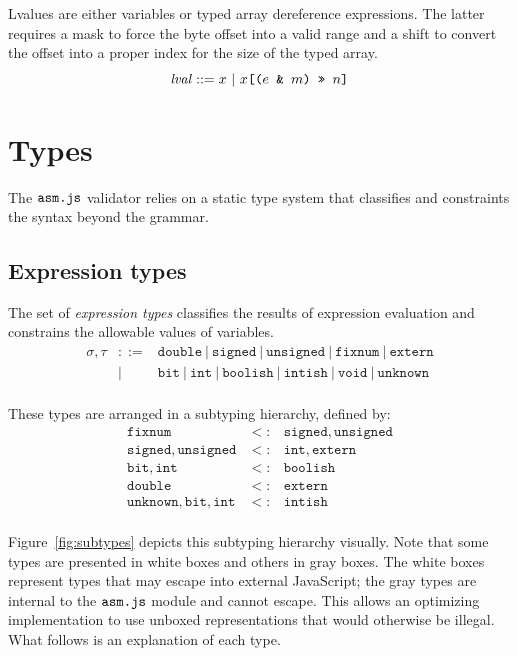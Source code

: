 \documentclass{article}
\newcommand{\paren}[1]{\mathjs{(}{#1}\mathjs{)}}
\newcommand{\mathjs}[1]{\mbox{\texttt{{#1}}}}
\newcommand{\bit}{\mathtt{bit}}
\newcommand{\unsigned}{\mathtt{unsigned}}
\newcommand{\signed}{\mathtt{signed}}
\newcommand{\fixnum}{\mathtt{fixnum}}
\newcommand{\double}{\mathtt{double}}
\newcommand{\extern}{\mathtt{extern}}
\newcommand{\unk}{\mathtt{unknown}}
\newcommand{\void}{\mathtt{void}}
\newcommand{\getprop}[2]{{#1}\mathjs{[}{#2}\mathjs{]}}
\renewcommand{\int}{\mathtt{int}}
\newcommand{\boolish}{\mathtt{boolish}}
\newcommand{\intish}{\mathtt{intish}}
\begin{document}
Lvalues are either variables or typed array dereference
expressions. The latter requires a mask to force the byte offset into
a valid range and a shift to convert the offset into a proper index
for the size of the typed array.
\[
\mathit{lval} ::= x ~|~ \getprop{x}{\paren{e\mathjs{ \& }m}\mathjs{ >> }n}
\]

\section{Types}
\label{sec:types}

The $\mathjs{asm.js}$ validator relies on a static type system that
classifies and constraints the syntax beyond the grammar.

\subsection{Expression types}

The set of {\it expression types} classifies the results of expression
evaluation and constrains the allowable values of variables.
\[
\begin{array}{rcl}
\sigma, \tau & ::= & \double ~|~ \signed ~|~ \unsigned ~|~ \fixnum ~|~ \extern \\
             &  |  & \bit ~|~ \int ~|~ \boolish ~|~ \intish ~|~ \void ~|~ \unk \\
\end{array}
\]

These types are arranged in a subtyping hierarchy, defined by:
\[
\begin{array}{rcl}
\fixnum            & <: & \signed, \unsigned \\
\signed, \unsigned & <: & \int, \extern \\
\bit, \int         & <: & \boolish \\
\double            & <: & \extern \\
\unk, \bit, \int   & <: & \intish \\
\end{array}
\]

Figure~\ref{fig:subtypes} depicts this subtyping hierarchy
visually. Note that some types are presented in white boxes and others
in gray boxes. The white boxes represent types that may escape into
external JavaScript; the gray types are internal to the
$\mathjs{asm.js}$ module and cannot escape. This allows an optimizing
implementation to use unboxed representations that would otherwise be
illegal. What follows is an explanation of each type.
\end{document}
